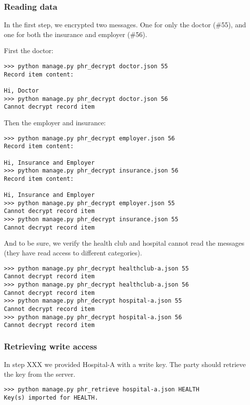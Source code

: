 \documentclass[a4paper]{article}
\begin{document}
		\subsubsection{Reading data}\label{sec:usecase_5}
			In the first step, we encrypted two messages. One for only the doctor (\#55), and one for both the insurance and employer (\#56). 
			
			First the doctor:
			
			\begin{lstlisting}
>>> python manage.py phr_decrypt doctor.json 55
Record item content:

Hi, Doctor
>>> python manage.py phr_decrypt doctor.json 56
Cannot decrypt record item
			\end{lstlisting}

			Then the employer and insurance:

			\begin{lstlisting}
>>> python manage.py phr_decrypt employer.json 56
Record item content:

Hi, Insurance and Employer
>>> python manage.py phr_decrypt insurance.json 56
Record item content:

Hi, Insurance and Employer
>>> python manage.py phr_decrypt employer.json 55
Cannot decrypt record item
>>> python manage.py phr_decrypt insurance.json 55
Cannot decrypt record item
			\end{lstlisting}
			
			And to be sure, we verify the health club and hospital cannot read the messages (they have read access to different categories).

			\begin{lstlisting}
>>> python manage.py phr_decrypt healthclub-a.json 55
Cannot decrypt record item
>>> python manage.py phr_decrypt healthclub-a.json 56
Cannot decrypt record item
>>> python manage.py phr_decrypt hospital-a.json 55
Cannot decrypt record item
>>> python manage.py phr_decrypt hospital-a.json 56
Cannot decrypt record item
			\end{lstlisting}
		
		\subsubsection{Retrieving write access}\label{sec:usecase_6}
			In step XXX we provided Hospital-A with a write key. The party should retrieve the key from the server.
			
			\begin{lstlisting}
>>> python manage.py phr_retrieve hospital-a.json HEALTH
Key(s) imported for HEALTH.
			\end{lstlisting}
			
\end{document}
